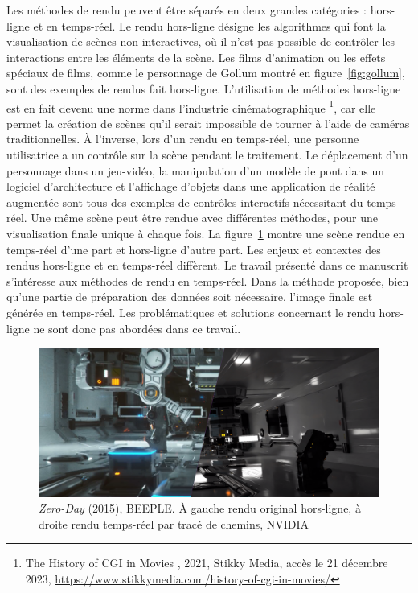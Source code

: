 Les méthodes de rendu peuvent être séparés en deux grandes catégories : hors-ligne et en temps-réel. Le rendu hors-ligne désigne les algorithmes qui font la visualisation de scènes non interactives, où il n'est pas possible de contrôler les interactions entre les éléments de la scène. Les films d'animation ou les effets spéciaux de films, comme le personnage de Gollum montré en figure~\ref{fig:gollum}, sont des exemples de rendus fait hors-ligne. L'utilisation de méthodes hors-ligne est en fait devenu une norme dans l'industrie cinématographique \footnote{\og The History of CGI in Movies \fg, 2021, Stikky Media, accès le 21 décembre 2023, \url{https://www.stikkymedia.com/history-of-cgi-in-movies/}}, car elle permet la création de scènes qu'il serait impossible de tourner à l'aide de caméras traditionnelles. À l'inverse, lors d'un rendu en temps-réel, une personne utilisatrice a un contrôle sur la scène pendant le traitement. Le déplacement d'un personnage dans un jeu-vidéo, la manipulation d'un modèle de pont dans un logiciel d'architecture et l'affichage d'objets dans une application de réalité augmentée sont tous des exemples de contrôles interactifs nécessitant du temps-réel. Une même scène peut être rendue avec différentes méthodes, pour une visualisation finale unique à chaque fois. La figure~\ref{fig:zero-day} montre une scène rendue en temps-réel d'une part et hors-ligne d'autre part. Les enjeux et contextes des rendus hors-ligne et en temps-réel diffèrent. Le travail présenté dans ce manuscrit s'intéresse aux méthodes de rendu en temps-réel. Dans la méthode proposée, bien qu'une partie de préparation des données soit nécessaire, l'image finale est générée en temps-réel. Les problématiques et solutions concernant le rendu hors-ligne ne sont donc pas abordées dans ce travail.

\bigskip

\begin{figure}[ht]
    \centering
    \includegraphics[width=\textwidth]{contenu/resources/images/zero_day_comparison}
    \caption[\textit{Zero-Day} (2015), BEEPLE]{\textit{Zero-Day} (2015), BEEPLE. À gauche rendu original hors-ligne, à droite rendu temps-réel par tracé de chemins, NVIDIA~\cite{winkelman_zero-day_2019}}
    \label{fig:zero-day}
\end{figure}

